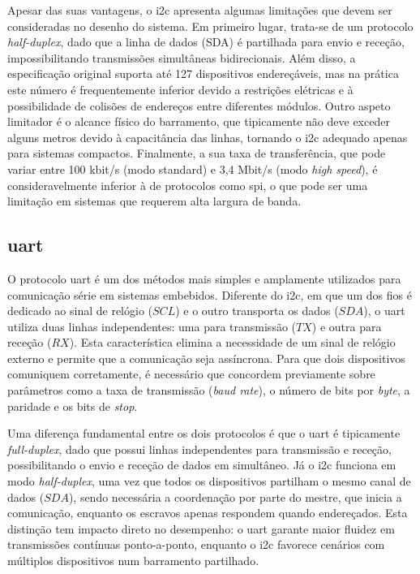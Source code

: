 Apesar das suas vantagens, o \gls{i2c} apresenta algumas limitações que devem ser consideradas no desenho do sistema. Em primeiro lugar, trata-se de um protocolo \textit{half-duplex}, dado que a linha de dados (SDA) é partilhada para envio e receção, impossibilitando transmissões simultâneas bidirecionais. Além disso, a especificação original suporta até 127 dispositivos endereçáveis, mas na prática este número é frequentemente inferior devido a restrições elétricas e à possibilidade de colisões de endereços entre diferentes módulos. Outro aspeto limitador é o alcance físico do barramento, que tipicamente não deve exceder alguns metros devido à capacitância das linhas, tornando o \gls{i2c} adequado apenas para sistemas compactos. Finalmente, a sua taxa de transferência, que pode variar entre 100 kbit/s (modo standard) e 3,4 Mbit/s (modo \emph{high speed}), é consideravelmente inferior à de protocolos como \gls{spi}, o que pode ser uma limitação em sistemas que requerem alta largura de banda.

\subsection{\acrfull{uart}} 
\label{subsec:uart}

O protocolo \gls{uart} é um dos métodos mais simples e amplamente utilizados para comunicação série em sistemas embebidos. Diferente do \gls{i2c}, em que um dos fios é dedicado ao sinal de relógio (\(SCL\)) e o outro transporta os dados (\(SDA\)), o \gls{uart} utiliza duas linhas independentes: uma para transmissão (\(TX\)) e outra para receção (\(RX\)). Esta característica elimina a necessidade de um sinal de relógio externo e permite que a comunicação seja assíncrona. Para que dois dispositivos comuniquem corretamente, é necessário que concordem previamente sobre parâmetros como a taxa de transmissão (\emph{baud rate}), o número de bits por \emph{byte}, a paridade e os bits de \emph{stop}.

Uma diferença fundamental entre os dois protocolos é que o \gls{uart} é tipicamente \textit{full-duplex}, dado que possui linhas independentes para transmissão e receção, possibilitando o envio e receção de dados em simultâneo. Já o \gls{i2c} funciona em modo \textit{half-duplex}, uma vez que todos os dispositivos partilham o mesmo canal de dados (\(SDA\)), sendo necessária a coordenação por parte do mestre, que inicia a comunicação, enquanto os escravos apenas respondem quando endereçados. Esta distinção tem impacto direto no desempenho: o \gls{uart} garante maior fluidez em transmissões contínuas ponto-a-ponto, enquanto o \gls{i2c} favorece cenários com múltiplos dispositivos num barramento partilhado.

